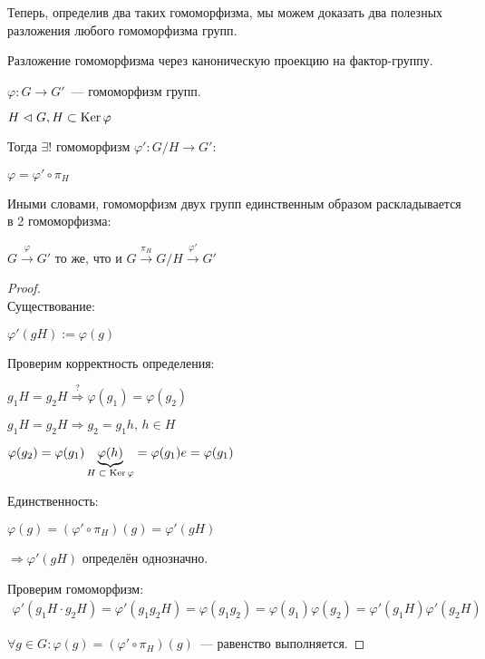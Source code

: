 Теперь, определив два таких гомоморфизма, мы можем доказать два полезных разложения любого гомоморфизма групп. 

\begin{theorem-non}
    Разложение гомоморфизма через каноническую проекцию на фактор-группу.

    $\varphi: G \to G'$~--- гомоморфизм групп.

    $H \vartriangleleft G, H \subset \operatorname{Ker} \varphi$

    Тогда $\exists !$ гомоморфизм $\varphi': G/H \to G':$

    $\varphi = \varphi' \circ \pi_{H}$

    Иными словами, гомоморфизм двух групп единственным образом раскладывается в 2 гомоморфизма:

    $G \stackrel{\varphi}{\to} G'$ то же, что и $G \stackrel{\pi_{H}}{\to} G / H \stackrel{\varphi'}{\to} G'$

    \begin{proof}
        $ $ \\
        Существование:

        $\varphi'(gH) := \varphi(g)$

        Проверим корректность определения:

        $g_1H = g_2H \stackrel{?}{\Longrightarrow} \varphi(g_1) = \varphi(g_2)$
        
        $g_1H = g_2H \Longrightarrow g_2 = g_1h,\, h \in H$

        $\varphi(g_2) = \varphi(g_1)\underbrace{\varphi(h)}_{\text{$H \subset \operatorname{Ker} \varphi$}} = \varphi(g_1)e = \varphi(g_1)$

        Единственность:

        $\varphi(g) = (\varphi' \circ \pi_{H})(g) = \varphi'(gH)$

        $\Longrightarrow \varphi'(gH)$ определён однозначно.

        Проверим гомоморфизм:
        \begin{gather*}
            \varphi'(g_1H \cdot g_2H) = \varphi'(g_1g_2H) = \varphi(g_1g_2) = \varphi(g_1)\varphi(g_2) = \varphi'(g_1H)\varphi'(g_2H)    
        \end{gather*}
        
        $\forall g \in G: \varphi(g) = (\varphi' \circ \pi_{H})(g)$~--- равенство выполняется.
    \end{proof}
\end{theorem-non}

